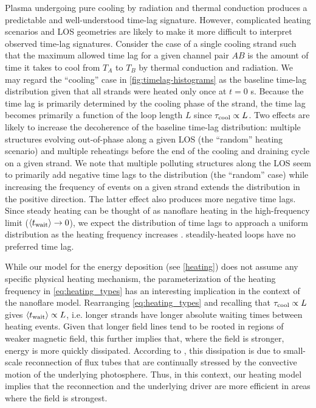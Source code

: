 Plasma undergoing pure cooling by radiation and thermal conduction produces a predictable and well-understood time-lag signature. However, complicated heating scenarios and LOS geometries are likely to make it more difficult to interpret observed time-lag signatures. Consider the case of a single cooling strand such that the maximum allowed time lag for a given channel pair $AB$ is the amount of time it takes to cool from $T_A$ to $T_B$ by thermal conduction and radiation. We may regard the ``cooling'' case in \autoref{fig:timelag-histograms} as the baseline time-lag distribution given that all strands were heated only once at $t=0$ s. Because the time lag is primarily determined by the cooling phase of the strand, the time lag becomes primarily a function of the loop length $L$ since $\tau_\textup{cool}\propto L$. Two effects are likely to increase the decoherence of the baseline time-lag distribution: multiple structures evolving out-of-phase along a given LOS (the ``random'' heating scenario) and multiple reheatings before the end of the cooling and draining cycle on a given strand. We note that multiple polluting structures along the LOS seem to primarily add negative time lags to the distribution (the ``random'' case) while increasing the frequency of events on a given strand extends the distribution in the positive direction. The latter effect also produces more negative time lags. Since steady heating can be thought of as nanoflare heating in the high-frequency limit ($\langle t_{\textup{wait}}\rangle\to0$), we expect the distribution of time lags to approach a uniform distribution as the heating frequency increases  \citep{viall_signatures_2016}.   steadily-heated loops have no preferred time lag.

While our model for the energy deposition (see \autoref{heating}) does not assume any specific physical heating mechanism, the parameterization of the heating frequency in \autoref{eq:heating_types} has an interesting implication in the context of the \citet{parker_nanoflares_1988} nanoflare model. Rearranging \autoref{eq:heating_types} and recalling that $\tau_\textup{cool}\propto L$ gives $\langle t_{\textup{wait}}\rangle\propto L$, i.e. longer strands have longer absolute waiting times between heating events. Given that longer field lines tend to be rooted in regions of weaker magnetic field, this further implies that, where the field is stronger, energy is more quickly dissipated. According to \citet{parker_nanoflares_1988}, this dissipation is due to small-scale reconnection of flux tubes that are continually stressed by the convective motion of the underlying photosphere. Thus, in this context, our heating model implies that the reconnection and the underlying driver are more efficient in areas where the field is strongest.

